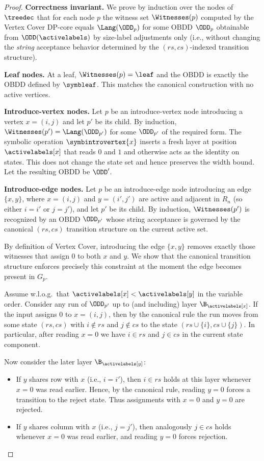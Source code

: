 \begin{proof}
\smallskip
\noindent\textbf{Correctness invariant.}
We prove by induction over the nodes of $\treedec$ that for each node $p$ the
witness set $\Witnesses(p)$ computed by the {\sc Vertex Cover} DP-core equals
$\Lang(\ODD_p)$ for some OBDD $\ODD_p$ obtainable from $\ODD(\activelabels)$ by
size-label adjustments only (i.e., without changing the \emph{string} acceptance
behavior determined by the $(rs,cs)$-indexed transition structure).

\smallskip
\noindent\textbf{Leaf nodes.}
At a leaf, $\Witnesses(p)=\leaf$ and the OBDD is exactly the OBDD defined by
$\symbleaf$. This matches the canonical construction with no active vertices.

\smallskip
\noindent\textbf{Introduce-vertex nodes.}
Let $p$ be an introduce-vertex node introducing a vertex $x=(i,j)$ and let $p'$
be its child. By induction, $\Witnesses(p')=\Lang(\ODD_{p'})$ for some $\ODD_{p'}$
of the required form. The symbolic operation $\symbintrovertex{x}$ inserts a
fresh layer at position $\activelabels[x]$ that reads $0$ and $1$ and otherwise
acts as the identity on states. This does not change the state set and hence
preserves the width bound. Let the resulting OBDD be $\ODD'$.

\smallskip
\noindent\textbf{Introduce-edge nodes.}
Let $p$ be an introduce-edge node introducing an edge $\{x,y\}$, where
$x=(i,j)$ and $y=(i',j')$ are active and adjacent in $R_n$ (so either $i=i'$ or
$j=j'$), and let $p'$ be its child. By induction, $\Witnesses(p')$ is recognized
by an OBDD $\ODD_{p'}$ whose string acceptance is governed by the canonical
$(rs,cs)$ transition structure on the current active set.

By definition of {\sc Vertex Cover}, introducing the edge $\{x,y\}$ removes
exactly those witnesses that assign $0$ to both $x$ and $y$. We show that the
canonical transition structure enforces precisely this constraint at the moment
the edge becomes present in $G_p$.

Assume w.l.o.g.\ that $\activelabels[x] < \activelabels[y]$ in the variable
order. Consider any run of $\ODD_{p'}$ up to (and including) layer
$\B_{\activelabels[x]}$. If the input assigns $0$ to $x=(i,j)$, then by the
canonical rule the run moves from some state $(rs,cs)$ with $i\notin rs$ and
$j\notin cs$ to the state $(rs\cup\{i\}, cs\cup\{j\})$. In particular, after
reading $x=0$ we have $i \in rs$ and $j \in cs$ in the current state component.

Now consider the later layer $\B_{\activelabels[y]}$:
\begin{itemize}
\item If $y$ shares row with $x$ (i.e., $i=i'$), then $i \in rs$ holds at this
layer whenever $x=0$ was read earlier. Hence, by the canonical rule, reading
$y=0$ forces a transition to the reject state. Thus assignments with $x=0$ and
$y=0$ are rejected.
\item If $y$ shares column with $x$ (i.e., $j=j'$), then analogously $j \in cs$
holds whenever $x=0$ was read earlier, and reading $y=0$ forces rejection.
\end{itemize}


\end{proof}
